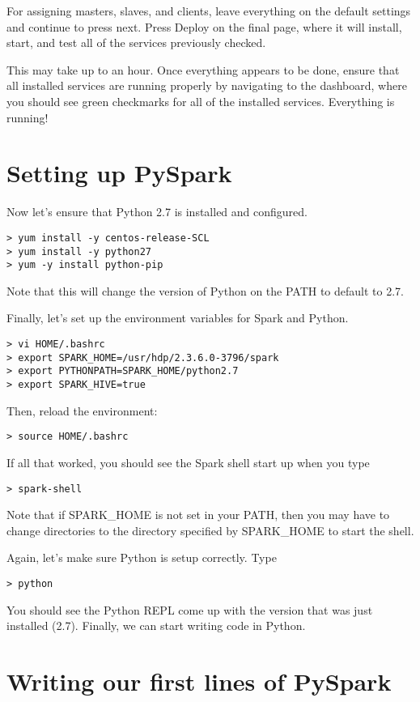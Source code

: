 \documentclass[9pt,twocolumn,twoside]{idsi}
\begin{document}
For assigning masters, slaves, and clients, leave everything on the default settings and continue to press next. Press Deploy on the final page, where it will install, start, and test all of the services previously checked. 

This may take up to an hour. Once everything appears to be done, ensure that all installed services are running properly by navigating to the dashboard, where you should see green checkmarks for all of the installed services. Everything is running!

\section{Setting up PySpark}

Now let's ensure that Python 2.7 is installed and configured.
\begin{verbatim}
> yum install -y centos-release-SCL
> yum install -y python27
> yum -y install python-pip
\end{verbatim}
Note that this will change the version of Python on the PATH to default to 2.7.

\noindent
Finally, let's set up the environment variables for Spark and Python.
\begin{verbatim}
> vi HOME/.bashrc
> export SPARK_HOME=/usr/hdp/2.3.6.0-3796/spark
> export PYTHONPATH=SPARK_HOME/python2.7
> export SPARK_HIVE=true
\end{verbatim}

\noindent
Then, reload the environment:
\begin{verbatim}
> source HOME/.bashrc
\end{verbatim}

If all that worked, you should see the Spark shell start up when you type
\begin{verbatim}
> spark-shell
\end{verbatim}

Note that if SPARK\_HOME is not set in your PATH, then you may have to change directories to the directory specified by SPARK\_HOME to start the shell.

Again, let's make sure Python is setup correctly. Type
\begin{verbatim}
> python
\end{verbatim}
You should see the Python REPL come up with the version that was just installed (2.7). Finally, we can start writing code in Python.

\section{Writing our first lines of PySpark}
\end{document}
